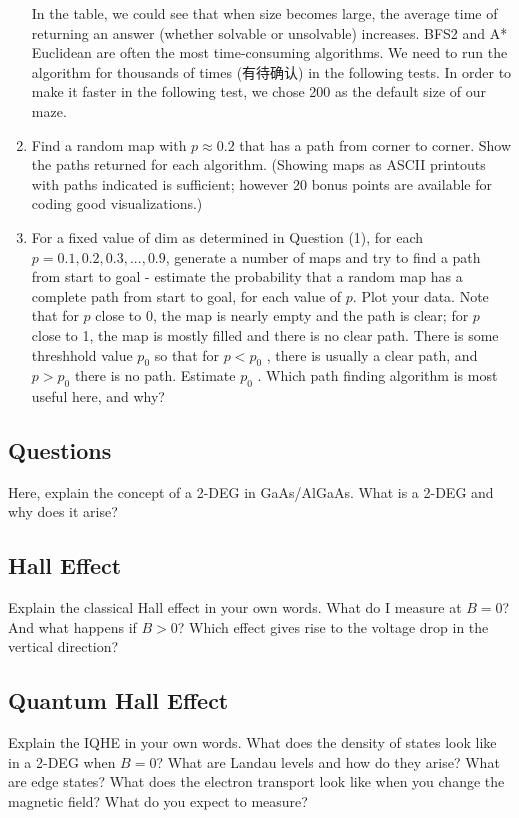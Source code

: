 \documentclass[letter]{article}
\begin{document}
\begin{enumerate}
	In the table, we could see that when size becomes large, the average time of returning an answer (whether solvable or unsolvable) increases. BFS2 and A* Euclidean are often the most time-consuming algorithms. We need to run the algorithm for thousands of times (有待确认) in the following tests. In order to make it faster in the following test, we chose 200 as the default size of our maze.
	
	\item {Find a random map with $ p \approx 0.2 $ that has a path from corner to corner. Show the paths returned for each algorithm. (Showing maps as ASCII printouts with paths indicated is sufficient; however 20 bonus points are available for coding good visualizations.)}
	
	\item {For a fixed value of dim as determined in Question (1), for each $ p = 0.1, 0.2, 0.3, ... , 0.9 $, generate a number of maps and try to find a path from start to goal - estimate the probability that a random map has a complete path from start to goal, for each value of $ p $. Plot your data. Note that for $ p $ close to 0, the map is nearly empty and the path is clear; for $ p $ close to 1, the map is mostly filled and there is no clear path. There is some threshhold value $ p_0 $ so that for $ p < p_0 $ , there is usually a clear path, and $ p > p_0 $ there is no path. Estimate $ p_0 $ . Which path finding algorithm is most useful here, and why?}
	
\end{enumerate}


\subsection{Questions}
Here, explain the concept of a 2-DEG in GaAs/AlGaAs. What is a 2-DEG and why does it arise?

\subsection{Hall Effect}
Explain the classical Hall effect in your own words. What do I measure at $B=0$? And what happens if $B>0$? Which effect gives rise to the voltage drop in the vertical direction?

\subsection{Quantum Hall Effect}
Explain the IQHE in your own words. What does the density of states look like in a 2-DEG when $B=0$? What are Landau levels and how do they arise? What are edge states? What does the electron transport look like when you change the magnetic field? What do you expect to measure?
\end{document}
